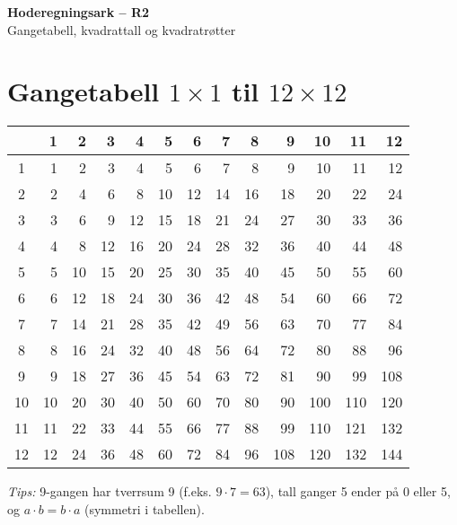 \documentclass[11pt]{article}
\begin{document}
\begin{center}
  {\LARGE \textbf{Hoderegningsark – R2}}\\[2mm]
  {\large Gangetabell, kvadrattall og kvadratrøtter}
\end{center}
\vspace{4mm}

\section*{Gangetabell $1\times 1$ til $12\times 12$}
\setlength{\tabcolsep}{6pt}
\renewcommand{\arraystretch}{1.15}
\small
\begin{center}
\begin{tabular}{c|*{12}{r}}
 & 1 & 2 & 3 & 4 & 5 & 6 & 7 & 8 & 9 & 10 & 11 & 12 \\
\hline
1  & 1  & 2  & 3  & 4  & 5  & 6  & 7  & 8  & 9  & 10  & 11  & 12  \\
2  & 2  & 4  & 6  & 8  & 10 & 12 & 14 & 16 & 18 & 20  & 22  & 24  \\
3  & 3  & 6  & 9  & 12 & 15 & 18 & 21 & 24 & 27 & 30  & 33  & 36  \\
4  & 4  & 8  & 12 & 16 & 20 & 24 & 28 & 32 & 36 & 40  & 44  & 48  \\
5  & 5  & 10 & 15 & 20 & 25 & 30 & 35 & 40 & 45 & 50  & 55  & 60  \\
6  & 6  & 12 & 18 & 24 & 30 & 36 & 42 & 48 & 54 & 60  & 66  & 72  \\
7  & 7  & 14 & 21 & 28 & 35 & 42 & 49 & 56 & 63 & 70  & 77  & 84  \\
8  & 8  & 16 & 24 & 32 & 40 & 48 & 56 & 64 & 72 & 80  & 88  & 96  \\
9  & 9  & 18 & 27 & 36 & 45 & 54 & 63 & 72 & 81 & 90  & 99  & 108 \\
10 & 10 & 20 & 30 & 40 & 50 & 60 & 70 & 80 & 90 & 100 & 110 & 120 \\
11 & 11 & 22 & 33 & 44 & 55 & 66 & 77 & 88 & 99 & 110 & 121 & 132 \\
12 & 12 & 24 & 36 & 48 & 60 & 72 & 84 & 96 & 108& 120 & 132 & 144 \\
\end{tabular}
\end{center}

\vspace{3mm}
\noindent\textit{Tips:} 9-gangen har tverrsum 9 (f.eks. $9\cdot7=63$), tall ganger 5 ender på 0 eller 5, og \(a\cdot b=b\cdot a\) (symmetri i tabellen).
\end{document}
